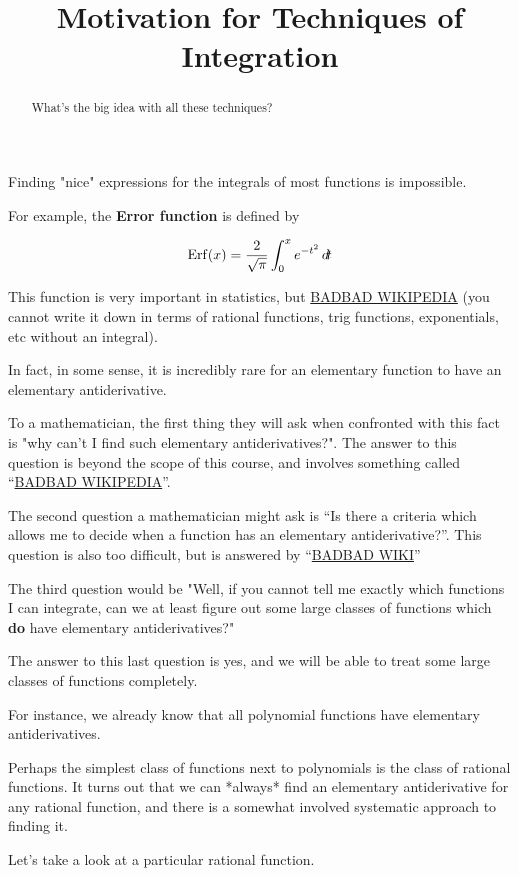 \documentclass{ximera}
\title[Dig-In:]{Motivation for Techniques of Integration}
\begin{document}
\begin{abstract}
	What's the big idea with all these techniques?
\end{abstract}
\maketitle

Finding "nice" expressions for the integrals of most functions is impossible.

For example, the \textbf{Error function} is defined by

\[
\mathrm{Erf}(x) = \frac{2}{\sqrt{\pi}} \int_0^x e^{-t^2} \mathop{}\!d\! t
\]

This function is very important in statistics, but \href{cannot be expressed as an elemenary function}{BADBAD WIKIPEDIA} (you cannot write it down in terms of rational functions, trig functions, exponentials, etc without an integral).

In fact, in some sense, it is incredibly rare for an elementary function to have an elementary antiderivative.

To a mathematician, the first thing they will ask when confronted with this fact is "why can't I find such elementary antiderivatives?".  The answer to this question is beyond the scope of this course, and involves something called ``\href{differential galois theory}{BADBAD WIKIPEDIA}''.

The second question a mathematician might ask is ``Is there a criteria which allows me to decide when a function has an elementary antiderivative?''.  This question is also too difficult, but is answered by ``\href{Louville's Criteria}{BADBAD WIKI}''

The third question would be "Well, if you cannot tell me exactly which functions I can integrate, can we at least figure out some large classes of functions which \textbf{do} have elementary antiderivatives?"

The answer to this last question is yes, and we will be able to treat some large classes of functions completely.

For instance, we already know that all polynomial functions have elementary antiderivatives.

Perhaps the simplest class of functions next to polynomials is the class of rational functions.  It turns out that we can *always* find an elementary antiderivative for any rational function, and there is a somewhat involved systematic approach to finding it.

Let's take a look at a particular rational function.
\end{document}
